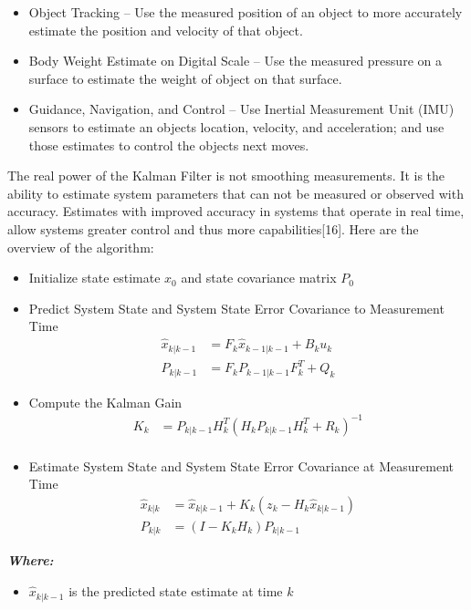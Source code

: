 \documentclass[conference]{IEEEtran}
\begin{document}
{\begin{itemize}
  \item Object Tracking – Use the measured position of an object to more accurately estimate the position and velocity of that object. \\
  \item Body Weight Estimate on Digital Scale – Use the measured pressure on a surface to estimate the weight of object on that surface. \\
  \item Guidance, Navigation, and Control – Use Inertial Measurement Unit (IMU) sensors to estimate an objects location, velocity, and acceleration; and use those estimates to control the objects next moves. 
\end{itemize}
The real power of the Kalman Filter is not smoothing measurements. It is the ability to estimate system parameters that can not be measured or observed with accuracy. Estimates with improved accuracy in systems that operate in real time, allow systems greater control and thus more capabilities[16]. Here are the overview of the algorithm:
\begin{itemize}
  \item Initialize state estimate \(x_0\) and state covariance matrix \(P_0\) \\
  \item Predict System State and System State Error Covariance to Measurement Time 
\begin{align*}
\hat{x}_{k|k-1} &= F_k \hat{x}_{k-1|k-1} + B_k u_k \\
P_{k|k-1} &= F_k P_{k-1|k-1} F_k^T + Q_k
\end{align*} 
  \item Compute the Kalman Gain
  \begin{align*}
K_k &= P_{k|k-1} H_k^T (H_k P_{k|k-1} H_k^T + R_k)^{-1} \\
\end{align*}
\item Estimate System State and System State Error Covariance at Measurement Time
\begin{align*}
\hat{x}_{k|k} &= \hat{x}_{k|k-1} + K_k(z_k - H_k \hat{x}_{k|k-1}) \\
P_{k|k} &= (I - K_k H_k) P_{k|k-1}
\end{align*}
\end{itemize}
  \begin{flushleft}
    \textit{\textbf{Where:}}
    \begin{itemize}
      \item $\hat{x}_{k|k-1}$ is the predicted state estimate at time $k$

\end{itemize}
\end{flushleft}}
\end{document}
